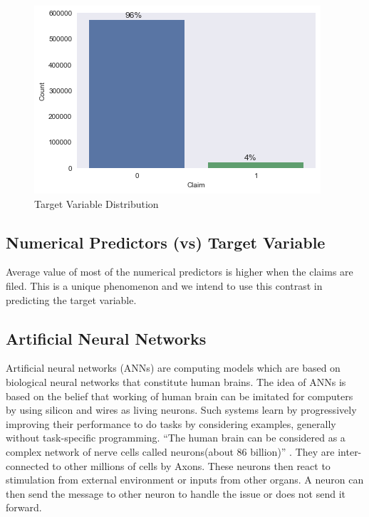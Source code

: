 \begin{figure}
 \centering\includegraphics[width=\columnwidth]{images/target}
 \caption{Target Variable Distribution}\label{f:numerical}
\end{figure}

\subsection{Numerical Predictors (vs) Target Variable}

 Average value of most of the numerical predictors is higher when the claims are filed. This is a unique phenomenon and we intend to use this contrast in predicting the target variable.
  
\subsection{Artificial Neural Networks}

Artificial neural networks (ANNs) are computing models which are based on biological neural networks that constitute human brains. The idea of ANNs is based on the belief that working of human brain can be imitated for computers by using silicon and wires as living neurons. Such systems learn by progressively improving their performance to do tasks by considering examples, generally without task-specific programming. ``The human brain can be considered as a complex network of nerve cells called neurons(about 86 billion)'' \cite{Ainet}. They are inter-connected to other millions of cells by Axons. These neurons then react to stimulation from external environment or inputs from other organs. A neuron can then send the message to other neuron to handle the issue or does not send it forward. 

